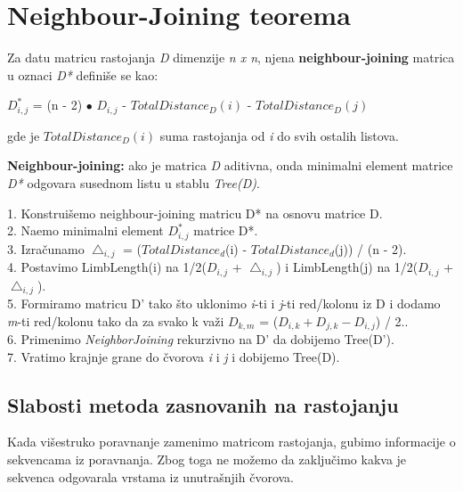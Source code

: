 \section{Neighbour-Joining teorema}
\label{sec:njt}

Za datu matricu rastojanja \textit{D} dimenzije \textit{n x n}, njena \textbf{neighbour-joining} matrica u oznaci \textit{D*} defini\v{s}e se kao:\\
\begin{center}
$D^*_{i, j}$ = (n - 2) $\bullet$ $D_{i, j}$ - $TotalDistance_D(i)$ - $TotalDistance_D(j)$
\end{center}

 gde je $TotalDistance_D(i)$ suma rastojanja od \textit{i} do svih ostalih listova.

\begin{teorema}
\textbf{Neighbour-joining:} ako je matrica \textit{D} aditivna, onda minimalni element matrice \textit{D*} odgovara susednom listu u stablu \textit{Tree(D)}.
\end{teorema}

\begin{tcolorbox}
1. Konstrui\v{s}emo neighbour-joining matricu D* na osnovu matrice D.\\
2. Na\dj emo minimalni element $D^*_{i, j}$ matrice D*.\\
3. Izra\v{c}unamo $\bigtriangleup_{i, j}$ = ($TotalDistance_d$(i) - $TotalDistance_d$(j)) / (n - 2).\\
4. Postavimo LimbLength(i) na 1/2($D_{i, j}$ + $\bigtriangleup_{i, j}$) i LimbLength(j) na 1/2($D_{i, j}$ + $\bigtriangleup_{i, j}$).\\
5. Formiramo matricu D' tako \v{s}to uklonimo \textit{i}-ti i \textit{j}-ti red/kolonu iz D i dodamo \textit{m}-ti red/kolonu tako da za svako k va\v{z}i $D_{k, m}$ = ($D_{i, k} + D_{j, k} - D_{i, j}$) / 2..\\
6. Primenimo \textit{NeighborJoining} rekurzivno na D' da dobijemo Tree(D').\\
7. Vratimo krajnje grane do \v{c}vorova \textit{i} i \textit{j} i dobijemo Tree(D).
\end{tcolorbox}

\subsection{Slabosti metoda zasnovanih na rastojanju}
\label{subsec:smznr}

Kada vi\v{s}estruko poravnanje zamenimo matricom rastojanja, gubimo informacije o sekvencama iz poravnanja. Zbog toga ne mo\v{z}emo da zaklju\v{c}imo kakva je sekvenca odgovarala vrstama iz unutra\v{s}njih \v{c}vorova.

